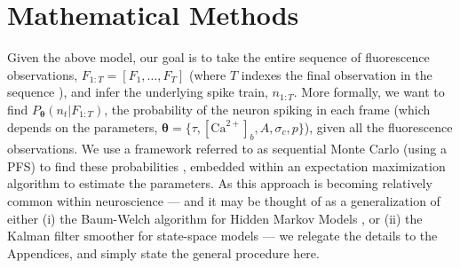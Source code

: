 \documentclass[10pt]{article}
\providecommand{\ve}[1]{\boldsymbol{#1}}
\providecommand{\ve}[1]{\boldsymbol{#1}}
\DeclareMathOperator*{\argmax}{argmax}
\newcommand{\thetn}{\ve{\theta}}
\newcommand{\p}{P_{\thetn}}
\newcommand{\Ca}{[\text{Ca}^{2+}]}
\begin{document}
\section*{Mathematical Methods} \label{sec:math_meth}

Given the above model, our goal is to take the entire sequence of fluorescence observations, $F_{1:T}=[F_1, \ldots, F_T]$ (where $T$ indexes the final observation in the sequence%
), and infer the underlying spike train, $n_{1:T}$. More formally, we want to find $\p(n_t | F_{1:T})$, the probability of the neuron spiking in each frame (which depends on the parameters, $\ve{\theta}=\{\tau, \Ca_b, A, \sigma_c, p\}$), given all the fluorescence observations.   
%
%
%
We use a framework referred to as sequential Monte Carlo (using a PFS) to find these probabilities \cite{DoucetGordon01}, embedded within an expectation maximization algorithm \cite{DempsterRubin77} to estimate the parameters. As this approach is becoming relatively common within neuroscience \cite{GaoDonoghue02, BrockwellKass04, KellyLee04, SamejimaKimura04, HuysPaninski06b, Sanger07, ErgunBrown07} --- and it may be thought of as a generalization of either (i) the Baum-Welch algorithm for Hidden Markov Models \cite{Rabiner89}, or (ii) the Kalman filter smoother for state-space models \cite{Kalman60} ---  we relegate the details to the Appendices, and simply state the general procedure here.
\end{document}
